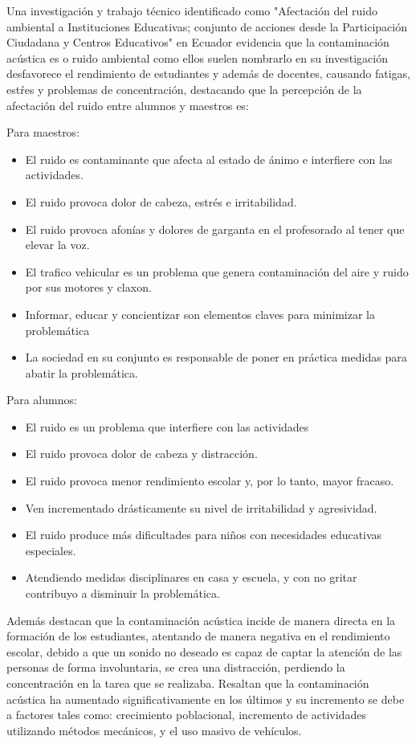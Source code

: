 {{Una investigación y trabajo técnico identificado como "Afectación del ruido ambiental a Instituciones Educativas; conjunto de acciones desde la Participación Ciudadana y Centros Educativos" en Ecuador evidencia que la contaminación acústica es o ruido ambiental como ellos suelen nombrarlo en su investigación desfavorece el rendimiento de estudiantes y además de docentes, causando fatigas, estŕes y problemas de concentración, destacando que la percepción de la afectación del ruido entre alumnos y maestros es:

Para maestros:
\begin{itemize}
    \item El ruido es contaminante que afecta al estado de ánimo e interfiere con las actividades.
    \item El ruido provoca dolor de cabeza, estrés e irritabilidad.
    \item El ruido provoca afonías y dolores de garganta en el profesorado al tener que elevar la voz.
    \item El trafico vehicular es un problema que genera contaminación del aire y ruido por sus motores y claxon.
    \item Informar, educar y concientizar son elementos claves para minimizar la problemática
    \item La sociedad en su conjunto es responsable de poner en práctica medidas para abatir la problemática.
\end{itemize}

Para alumnos:
\begin{itemize}
    \item El ruido es un problema que interfiere con las actividades
    \item El ruido provoca dolor de cabeza y distracción.
    \item El ruido provoca menor rendimiento escolar y, por lo tanto, mayor fracaso.
    \item Ven incrementado drásticamente su nivel de irritabilidad y agresividad.
    \item El ruido produce más dificultades para niños con necesidades educativas especiales.
    \item Atendiendo medidas disciplinares en casa y escuela, y con no gritar contribuyo a disminuir la problemática.
\end{itemize}

Además destacan que la contaminación acústica incide de manera directa en la formación de los estudiantes, atentando de manera negativa en el rendimiento escolar, debido a que un sonido no deseado es capaz de captar la atención de las personas de forma involuntaria, se crea una distracción, perdiendo la concentración en la tarea que se realizaba. Resaltan que la contaminación acústica ha aumentado significativamente en los últimos y su incremento se debe a factores tales como: crecimiento poblacional, incremento de actividades utilizando métodos mecánicos, y el uso masivo de vehículos. 

}}
